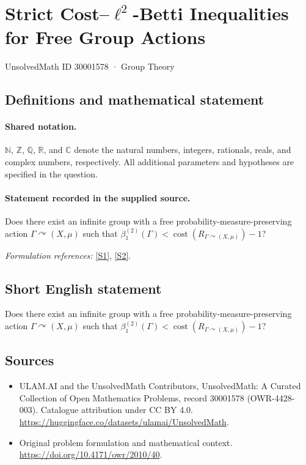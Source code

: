 \documentclass[11pt]{article}
\newcommand{\sref}[2]{\hyperlink{source:#1:#2}{[S#2]}}
\begin{document}
\setcounter{section}{30001577}
\section{\texorpdfstring{Strict Cost–$\ell^2$-Betti Inequalities for Free Group Actions}{Strict Cost–ell\textasciicircum{}2-Betti Inequalities for Free Group Actions}}\label{30001578}
{\small UnsolvedMath ID 30001578 · Group Theory}
\subsection{Definitions and mathematical statement}

\paragraph{Shared notation.}$\mathbb N$, $\mathbb Z$, $\mathbb Q$, $\mathbb R$, and $\mathbb C$ denote the natural numbers, integers, rationals, reals, and complex numbers, respectively. All additional parameters and hypotheses are specified in the question.


\paragraph{Statement recorded in the supplied source.}
Does there exist an infinite group with a free probability-measure-preserving action $\Gamma\curvearrowright(X,\mu)$ such that $\beta_1^{(2)}(\Gamma)<\operatorname{cost}(R_{\Gamma\curvearrowright(X,\mu)})-1$?
\par\smallskip\textit{Formulation references:} \sref{30001578}{1}, \sref{30001578}{2}.
\subsection{Short English statement}
Does there exist an infinite group with a free probability-measure-preserving action $\Gamma\curvearrowright(X,\mu)$ such that $\beta_1^{(2)}(\Gamma)<\operatorname{cost}(R_{\Gamma\curvearrowright(X,\mu)})-1$?
\subsection{Sources}
\begin{itemize}
\item[\hypertarget{source:30001578:1}{S1}] ULAM.AI and the UnsolvedMath Contributors, UnsolvedMath: A Curated Collection of Open Mathematics Problems, record 30001578 (OWR-4428-003). Catalogue attribution under CC BY 4.0.
\url{https://huggingface.co/datasets/ulamai/UnsolvedMath}.
\item[\hypertarget{source:30001578:2}{S2}] Original problem formulation and mathematical context.
\url{https://doi.org/10.4171/owr/2010/40}.
\end{itemize}
\label{end:30001578}
\end{document}
